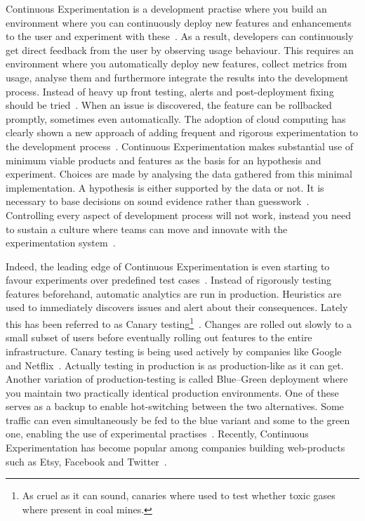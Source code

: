 \documentclass[english]{tktltiki2}
\begin{document}
Continuous Experimentation is a development practise where you build an environment where you can continuously deploy new features and enhancements to the user and experiment with these~\cite{FGM14}. As a result, developers can continuously get direct feedback from the user by observing usage behaviour. This requires an environment where you automatically deploy new features, collect metrics from usage, analyse them and furthermore integrate the results into the development process. Instead of heavy up front testing, alerts and post-deployment fixing should be tried~\cite{FGM14}. When an issue is discovered, the feature can be rollbacked promptly, sometimes even automatically. The adoption of cloud computing has clearly shown a new approach of adding frequent and rigorous experimentation to the development process~\cite{Bos12}. Continuous Experimentation makes substantial use of minimum viable products and features as the basis for an hypothesis and experiment. Choices are made by analysing the data gathered from this minimal implementation. A hypothesis is either supported by the data or not. It is necessary to base decisions on sound evidence rather than guesswork~\cite{FGM14}. Controlling every aspect of development process will not work, instead you need to sustain a culture where teams can move and innovate with the experimentation system~\cite{Rie11}.

Indeed, the leading edge of Continuous Experimentation is even starting to favour experiments over predefined test cases~\cite{New15}. Instead of rigorously testing features beforehand, automatic analytics are run in production. Heuristics are used to immediately discovers issues and alert about their consequences. Lately this has been referred to as Canary testing\footnote{As cruel as it can sound, canaries where used to test whether toxic gases where present in coal mines.}~\cite{HF11, Sat14}. Changes are rolled out slowly to a small subset of users before eventually rolling out features to the entire infrastructure. Canary testing is being used actively by companies like Google and Netflix~\cite{Whi11, Sch13}. Actually testing in production is as production-like as it can get. Another variation of production-testing is called Blue–Green deployment where you maintain two practically identical production environments. One of these serves as a backup to enable hot-switching between the two alternatives. Some traffic can even simultaneously be fed to the blue variant and some to the green one, enabling the use of experimental practises~\cite{Fow10, HF11}. Recently, Continuous Experimentation has become popular among companies building web-products such as Etsy, Facebook and Twitter~\cite{McK12, Boh13, New13, Rho14, Wan14}.
\end{document}
